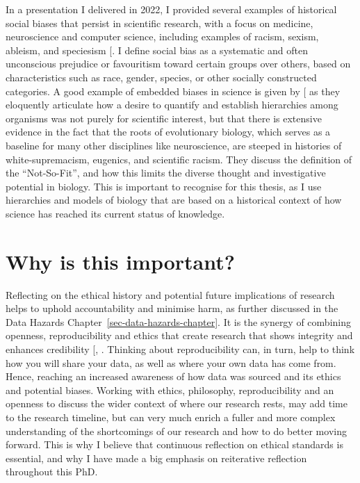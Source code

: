 \documentclass[
  11pt,
  letterpaper,
]{scrreprt}
\begin{document}
In a presentation I delivered in 2022, I provided several examples of
historical social biases that persist in scientific research, with a
focus on medicine, neuroscience and computer science, including examples
of racism, sexism, ableism, and speciesism
{[}\citeproc{ref-garcia2022Thinkinga}{379}{]}. I define social bias as a
systematic and often unconscious prejudice or favouritism toward certain
groups over others, based on characteristics such as race, gender,
species, or other socially constructed categories. A good example of
embedded biases in science is given by
{[}\citeproc{ref-branch2022Discussionsa}{419}{]} as they eloquently
articulate how a desire to quantify and establish hierarchies among
organisms was not purely for scientific interest, but that there is
extensive evidence in the fact that the roots of evolutionary biology,
which serves as a baseline for many other disciplines like neuroscience,
are steeped in histories of white-supremacism, eugenics, and scientific
racism. They discuss the definition of the ``Not-So-Fit'', and how this
limits the diverse thought and investigative potential in biology. This
is important to recognise for this thesis, as I use hierarchies and
models of biology that are based on a historical context of how science
has reached its current status of knowledge.

\section{Why is this important?}\label{why-is-this-important}

Reflecting on the ethical history and potential future implications of
research helps to uphold accountability and minimise harm, as further
discussed in the Data Hazards Chapter~\ref{sec-data-hazards-chapter}. It
is the synergy of combining openness, reproducibility and ethics that
create research that shows integrity and enhances credibility
{[},
\citeproc{ref-zhaksylyk2023Research}{421}{]}. Thinking about
reproducibility can, in turn, help to think how you will share your
data, as well as where your own data has come from. Hence, reaching an
increased awareness of how data was sourced and its ethics and potential
biases. Working with ethics, philosophy, reproducibility and an openness
to discuss the wider context of where our research rests, may add time
to the research timeline, but can very much enrich a fuller and more
complex understanding of the shortcomings of our research and how to do
better moving forward. This is why I believe that continuous reflection
on ethical standards is essential, and why I have made a big emphasis on
reiterative reflection throughout this PhD.
\end{document}
